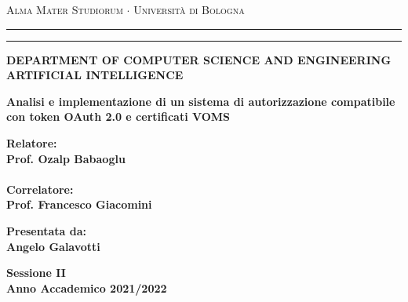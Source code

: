 \documentclass[12pt,a4paper,openright,twoside]{report}
\begin{document}
\begin{titlepage}
	\begin{center}
		{{\Large{\textsc{Alma Mater Studiorum $\cdot$ Università di
							Bologna}}}} \rule[0.1cm]{15.8cm}{0.1mm}
		\rule[0.5cm]{15.8cm}{0.6mm}
		{\small{\bf DEPARTMENT OF COMPUTER SCIENCE
		AND ENGINEERING\\
		ARTIFICIAL INTELLIGENCE }}
	\end{center}
	\vspace{15mm}
	\begin{center}
		{\LARGE{\bf Analisi e implementazione di un sistema di autorizzazione compatibile con token OAuth 2.0 e certificati VOMS}}\\
		\vspace{3mm}
	\end{center}
	\vspace{40mm}
	\par
	\noindent
	\begin{minipage}[t]{0.47\textwidth}
		{\large{\bf Relatore:\\
				Prof. Ozalp Babaoglu\\\\
				Correlatore:\\
				Prof. Francesco Giacomini}}
	\end{minipage}
	\hfill
	\begin{minipage}[t]{0.47\textwidth}\raggedleft
		{\large{\bf Presentata da:\\
				Angelo Galavotti}}
	\end{minipage}
	\vspace{20mm}
	\begin{center}
		{\large{\bf Sessione II\\
				Anno Accademico 2021/2022}}
	\end{center}
\end{titlepage}
\end{document}
